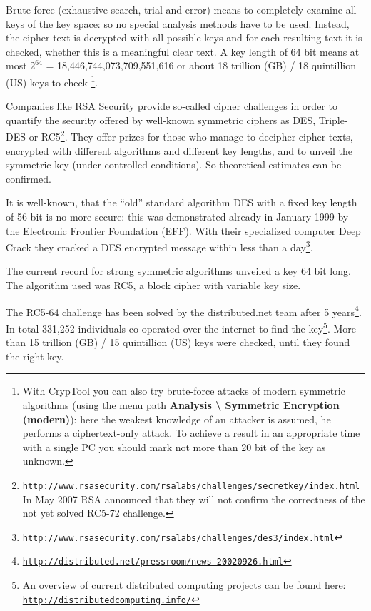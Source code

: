 Brute-force (exhaustive search, trial-and-error) means to completely examine all keys of the key space: so no special analysis methods have to be used. Instead, the cipher text is decrypted with all possible keys and for each resulting text it is checked, whether this is a meaningful clear text. A key length of 64 bit means at most $2^{64}$ = 18,446,744,073,709,551,616 or about 18 trillion (GB) / 18 quintillion (US)  keys to check%
\footnote{%
    With CrypTool you can also try brute-force attacks
    of modern symmetric algorithms (using the menu path
    {\bf Analysis \textbackslash{} Symmetric Encryption (modern)}): here
    the weakest knowledge of an attacker is assumed, he performs a 
    ciphertext-only attack.
    To achieve a result in an appropriate time with a single PC you should 
    mark not more than 20 bit of the key as unknown.
}.

Companies like RSA Security provide so-called cipher challenges in order to quantify the security offered by well-known symmetric ciphers as DES, Triple-DES or RC5\footnote{\href{http://www.rsasecurity.com/rsalabs/challenges/secretkey/index.html}{\tt http://www.rsasecurity.com/rsalabs/challenges/secretkey/index.html}\\
In May 2007 RSA announced that they will not confirm the correctness of the not yet solved RC5-72 challenge.}. They offer prizes for those who manage to decipher cipher texts, encrypted with different algorithms and different key lengths, and to unveil the symmetric key (under controlled conditions). So theoretical estimates can be confirmed.

It is well-known, that the ``old'' standard algorithm DES with a fixed key length of 56 bit is no more secure: this was demonstrated already in January 1999 by the Electronic Frontier Foundation (EFF). With their specialized computer Deep Crack they cracked a DES encrypted message within less than a day\footnote{\href{http://www.rsasecurity.com/rsalabs/challenges/des3/index.html}{\tt http://www.rsasecurity.com/rsalabs/challenges/des3/index.html}}.

The current record for strong symmetric algorithms unveiled a key 64 bit long. The algorithm used was RC5, a block cipher with variable key size. 

The RC5-64 challenge has been solved by the distributed.net team after 5 years\footnote{\href{http://distributed.net/pressroom/news-20020926.html}{\tt http://distributed.net/pressroom/news-20020926.html}}.  In total 331,252 individuals co-operated over the internet to find the key\footnote{%
An overview of current distributed computing projects can be found here:\\
\href{http://distributedcomputing.info/}{\tt http://distributedcomputing.info/}
}. More than 15 trillion (GB) / 15 quintillion (US)  keys were checked, until they found the right key.

